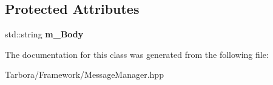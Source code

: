 \subsection*{Protected Attributes}
\begin{DoxyCompactItemize}
\item 
\mbox{\label{classTarbora_1_1MessageBody_a306d1c445f275b4b7097e3d66aff420d}} 
std\+::string {\bfseries m\+\_\+\+Body}
\end{DoxyCompactItemize}


The documentation for this class was generated from the following file\+:\begin{DoxyCompactItemize}
\item 
Tarbora/\+Framework/Message\+Manager.\+hpp\end{DoxyCompactItemize}

